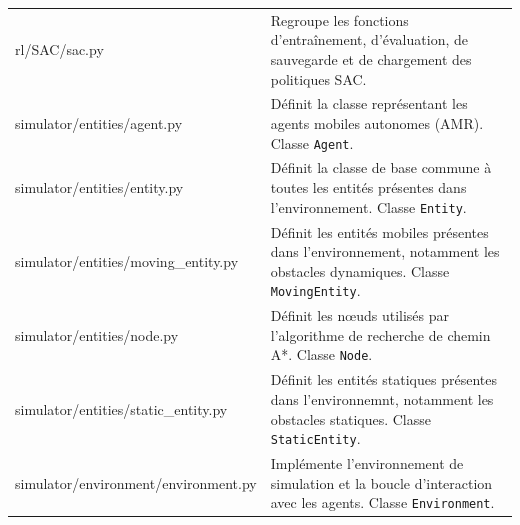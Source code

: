 \begin{longtable}{
        >{\ttfamily\small}p{}
        p{}
    }
    rl/SAC/sac.py
                                             & Regroupe les fonctions d'entraînement, d'évaluation, de sauvegarde et de chargement des politiques SAC.                                                                                                                                             \\

    simulator/entities/agent.py
                                             & Définit la classe représentant les agents mobiles autonomes (AMR). Classe \texttt{Agent}.                                                                                                                                                           \\

    simulator/entities/entity.py
                                             & Définit la classe de base commune à toutes les entités présentes dans l'environnement. Classe \texttt{Entity}.                                                                                                                                      \\

    simulator/entities/moving\_entity.py
                                             & Définit les entités mobiles présentes dans l'environnement, notamment les obstacles dynamiques. Classe \texttt{MovingEntity}.                                                                                                                       \\

    simulator/entities/node.py
                                             & Définit les nœuds utilisés par l'algorithme de recherche de chemin A*. Classe \texttt{Node}.                                                                                                                                                        \\

    simulator/entities/static\_entity.py
                                             & Définit les entités statiques présentes dans l'environnemnt, notamment les obstacles statiques. Classe \texttt{StaticEntity}.
    \\

    simulator/environment/environment.py
                                             & Implémente l'environnement de simulation et la boucle d'interaction avec les agents. Classe \texttt{Environment}.                                                                                                                                   \\


\end{longtable}
